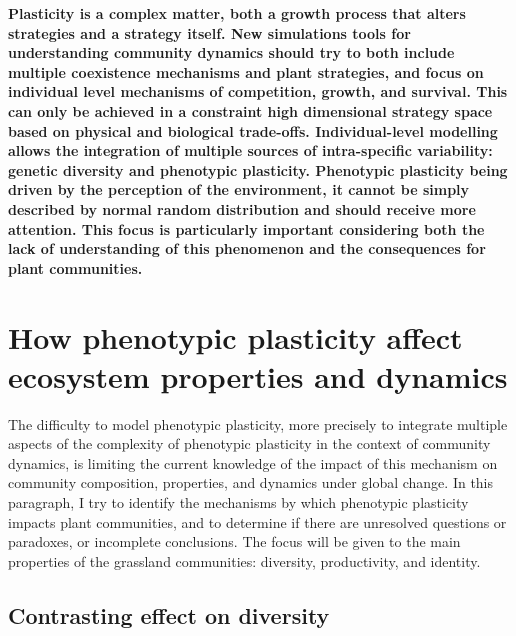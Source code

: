 


\textbf{Plasticity is a complex matter, both a growth process that alters strategies and a strategy itself. New simulations tools for understanding community dynamics should try to both include multiple coexistence mechanisms and plant strategies, and focus on individual level mechanisms of competition, growth, and survival. This can only be achieved in a constraint high dimensional strategy space based on physical and biological trade-offs. Individual-level modelling allows the integration of multiple sources of intra-specific variability: genetic diversity and phenotypic plasticity. Phenotypic plasticity being driven by the perception of the environment, it cannot be simply described by normal random distribution and should receive more attention. This focus is particularly important considering both the lack of understanding of this phenomenon and the consequences for plant communities.}


\section{How phenotypic plasticity affect ecosystem properties and dynamics}

The difficulty to model phenotypic plasticity, more precisely to integrate multiple aspects of the complexity of phenotypic plasticity in the context of community dynamics, is limiting the current knowledge of the impact of this mechanism on community composition, properties, and dynamics under global change. In this paragraph, I try to identify the mechanisms by which phenotypic plasticity impacts plant communities, and to determine if there are unresolved questions or paradoxes, or incomplete conclusions. The focus will be given to the main properties of the grassland communities: diversity, productivity, and identity.



\subsection{Contrasting effect on diversity}

